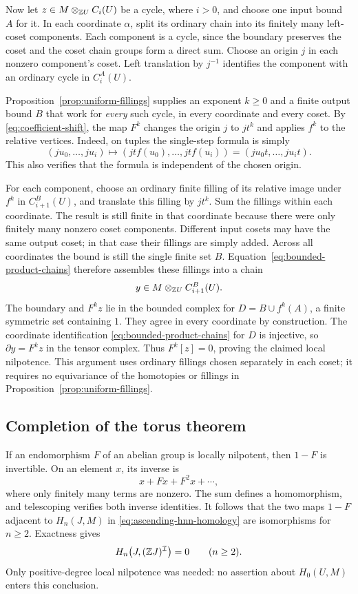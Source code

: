 Now let $z\in M\otimes_{\mathbb Z U}C_i(U)$ be a cycle, where $i>0$,
and choose one input bound $A$ for it.  In each coordinate
$\alpha$, split its ordinary chain into its finitely many
left-coset components.  Each component is a cycle, since the
boundary preserves the coset and the coset chain groups form a
direct sum.  Choose an origin $j$ in each nonzero component's
coset.  Left translation by $j^{-1}$ identifies the component
with an ordinary cycle in $C_i^A(U)$.

Proposition~\ref{prop:uniform-fillings} supplies an exponent
$k\ge0$ and a finite output bound $B$ that work for
\emph{every} such cycle, in every coordinate and every coset.
By \eqref{eq:coefficient-shift}, the map $F^k$ changes the
origin $j$ to $jt^k$ and applies $f^k$ to the relative vertices.
Indeed, on tuples the single-step formula is simply
\[
 (ju_0,\ldots,ju_i)
    \longmapsto(jt f(u_0),\ldots,jt f(u_i))
    =(ju_0t,\ldots,ju_it).
\]
This also verifies that the formula is independent of the
chosen origin.

For each component, choose an ordinary finite filling of its
relative image under $f^k$ in $C_{i+1}^B(U)$, and translate
this filling by $jt^k$.  Sum the fillings within each coordinate.
The result is still finite in that coordinate because there were
only finitely many nonzero coset components.  Different input
cosets may have the same output coset; in that case their
fillings are simply added.  Across all coordinates the bound
is still the single finite set $B$.
Equation~\eqref{eq:bounded-product-chains} therefore assembles
these fillings into a chain
\[
 y\in M\otimes_{\mathbb Z U}C_{i+1}^B(U).
\]
The boundary and $F^kz$ lie in the bounded complex for
$D=B\cup f^k(A)$, a finite symmetric set containing $1$.  They agree
in every coordinate by construction.  The coordinate identification
\eqref{eq:bounded-product-chains} for $D$ is injective, so
$\partial y=F^kz$ in the tensor complex.
Thus $F^k[z]=0$, proving the claimed local nilpotence.  This
argument uses ordinary fillings chosen separately in each coset;
it requires no equivariance of the homotopies or fillings in
Proposition~\ref{prop:uniform-fillings}.

\subsection{Completion of the torus theorem}

If an endomorphism $F$ of an abelian group is locally nilpotent,
then $1-F$ is invertible.  On an element $x$, its inverse is
\[
 x+Fx+F^2x+\cdots,
\]
where only finitely many terms are nonzero.  The sum defines a
homomorphism, and telescoping verifies both inverse identities.
It follows that the two maps $1-F$ adjacent to $H_n(J,M)$ in
\eqref{eq:ascending-hnn-homology} are isomorphisms for $n\ge2$.
Exactness gives
\[
 H_n\bigl(J,(\mathbb Z J)^{\mathcal I}\bigr)=0
 \qquad(n\ge2).
\]
Only positive-degree local nilpotence was needed: no assertion
about $H_0(U,M)$ enters this conclusion.

